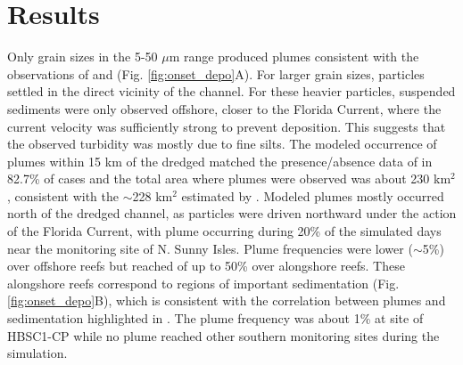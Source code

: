 \section{Results}

Only grain sizes in the 5-50 $\mu$m range produced plumes consistent with the observations of \cite{barnes2015sediment} and \cite{cunning2019extensive} (Fig. \ref{fig:onset_depo}A). For larger grain sizes, particles settled in the direct vicinity of the channel. For these heavier particles, suspended sediments were only observed offshore, closer to the Florida Current, where the current velocity was sufficiently strong to prevent deposition. This suggests that the observed turbidity was mostly due to fine silts. The modeled occurrence of plumes within 15 km of the dredged matched the presence/absence data of \cite{cunning2019extensive} in 82.7\% of cases and the total area where plumes were observed was about 230 km$^2$, consistent with the $\sim$228 km$^2$ estimated by \cite{barnes2015sediment}. Modeled plumes mostly occurred north of the dredged channel, as particles were driven northward under the action of the Florida Current, with plume occurring during 20\% of the simulated days near the monitoring site of N. Sunny Isles. Plume frequencies were lower ($\sim$5\%) over offshore reefs but reached of up to 50\% over alongshore reefs. These alongshore reefs correspond to regions of important sedimentation (Fig. \ref{fig:onset_depo}B), which is consistent with the correlation between plumes and sedimentation highlighted in \cite{cunning2019extensive}. The plume frequency was about 1\% at site of HBSC1-CP while no plume reached other southern monitoring sites during the simulation. 


